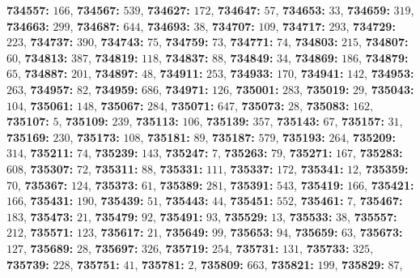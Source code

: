 \textsf{\bfseries 734557:} $166$, \textsf{\bfseries 734567:} $539$, \textsf{\bfseries 734627:} $172$, \textsf{\bfseries 734647:} $57$, \textsf{\bfseries 734653:} $33$, \textsf{\bfseries 734659:} $319$, \textsf{\bfseries 734663:} $299$, \textsf{\bfseries 734687:} $644$, \textsf{\bfseries 734693:} $38$, \textsf{\bfseries 734707:} $109$, \textsf{\bfseries 734717:} $293$, \textsf{\bfseries 734729:} $223$, \textsf{\bfseries 734737:} $390$, \textsf{\bfseries 734743:} $75$, \textsf{\bfseries 734759:} $73$, \textsf{\bfseries 734771:} $74$, \textsf{\bfseries 734803:} $215$, \textsf{\bfseries 734807:} $60$, \textsf{\bfseries 734813:} $387$, \textsf{\bfseries 734819:} $118$, \textsf{\bfseries 734837:} $88$, \textsf{\bfseries 734849:} $34$, \textsf{\bfseries 734869:} $186$, \textsf{\bfseries 734879:} $65$, \textsf{\bfseries 734887:} $201$, \textsf{\bfseries 734897:} $48$, \textsf{\bfseries 734911:} $253$, \textsf{\bfseries 734933:} $170$, \textsf{\bfseries 734941:} $142$, \textsf{\bfseries 734953:} $263$, \textsf{\bfseries 734957:} $82$, \textsf{\bfseries 734959:} $686$, \textsf{\bfseries 734971:} $126$, \textsf{\bfseries 735001:} $283$, \textsf{\bfseries 735019:} $29$, \textsf{\bfseries 735043:} $104$, \textsf{\bfseries 735061:} $148$, \textsf{\bfseries 735067:} $284$, \textsf{\bfseries 735071:} $647$, \textsf{\bfseries 735073:} $28$, \textsf{\bfseries 735083:} $162$, \textsf{\bfseries 735107:} $5$, \textsf{\bfseries 735109:} $239$, \textsf{\bfseries 735113:} $106$, \textsf{\bfseries 735139:} $357$, \textsf{\bfseries 735143:} $67$, \textsf{\bfseries 735157:} $31$, \textsf{\bfseries 735169:} $230$, \textsf{\bfseries 735173:} $108$, \textsf{\bfseries 735181:} $89$, \textsf{\bfseries 735187:} $579$, \textsf{\bfseries 735193:} $264$, \textsf{\bfseries 735209:} $314$, \textsf{\bfseries 735211:} $74$, \textsf{\bfseries 735239:} $143$, \textsf{\bfseries 735247:} $7$, \textsf{\bfseries 735263:} $79$, \textsf{\bfseries 735271:} $167$, \textsf{\bfseries 735283:} $608$, \textsf{\bfseries 735307:} $72$, \textsf{\bfseries 735311:} $88$, \textsf{\bfseries 735331:} $111$, \textsf{\bfseries 735337:} $172$, \textsf{\bfseries 735341:} $12$, \textsf{\bfseries 735359:} $70$, \textsf{\bfseries 735367:} $124$, \textsf{\bfseries 735373:} $61$, \textsf{\bfseries 735389:} $281$, \textsf{\bfseries 735391:} $543$, \textsf{\bfseries 735419:} $166$, \textsf{\bfseries 735421:} $166$, \textsf{\bfseries 735431:} $190$, \textsf{\bfseries 735439:} $51$, \textsf{\bfseries 735443:} $44$, \textsf{\bfseries 735451:} $552$, \textsf{\bfseries 735461:} $7$, \textsf{\bfseries 735467:} $183$, \textsf{\bfseries 735473:} $21$, \textsf{\bfseries 735479:} $92$, \textsf{\bfseries 735491:} $93$, \textsf{\bfseries 735529:} $13$, \textsf{\bfseries 735533:} $38$, \textsf{\bfseries 735557:} $212$, \textsf{\bfseries 735571:} $123$, \textsf{\bfseries 735617:} $21$, \textsf{\bfseries 735649:} $99$, \textsf{\bfseries 735653:} $94$, \textsf{\bfseries 735659:} $63$, \textsf{\bfseries 735673:} $127$, \textsf{\bfseries 735689:} $28$, \textsf{\bfseries 735697:} $326$, \textsf{\bfseries 735719:} $254$, \textsf{\bfseries 735731:} $131$, \textsf{\bfseries 735733:} $325$, \textsf{\bfseries 735739:} $228$, \textsf{\bfseries 735751:} $41$, \textsf{\bfseries 735781:} $2$, \textsf{\bfseries 735809:} $663$, \textsf{\bfseries 735821:} $199$, \textsf{\bfseries 735829:} $87$, 
